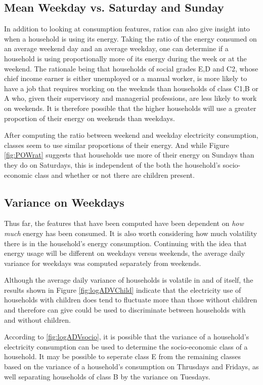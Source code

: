 \subsection*{Mean Weekday vs. Saturday and Sunday}
In addition to looking at consumption features, ratios can also give insight into when a household is using its energy. Taking the ratio of the energy consumed on an average weekend day and an average weekday, one can determine if a household is using proportionally more of its energy during the week or at the weekend. The rationale being that households of social grades E,D and C2, whose chief income earner is either unemployed or a manual worker, is more likely to have a job that requires working on the weeknds than households of class C1,B or A who, given their supervisory and managerial professions, are less likely to work on weekends. It is therefore possible that the higher households will use a greater proportion of their energy on weekends than weekdays. 
\POWrat

After computing the ratio between weekend and weekday electricity consumption, classes seem to use similar proportions of their energy. And while Figure \ref{fig:POWrat} suggests that households use more of their energy on Sundays than they do on Saturdays, this is independent of the both the household's socio-economic class and whether or not there are children present.


\subsection*{Variance on Weekdays}
Thus far, the features that have been computed have been dependent on \textit{how much} energy has been consumed. It is also worth considering how much volatility there is in the household's energy consumption. Continuing with the idea that energy usage will be different on weekdays versus weekends, the average daily variance for weekdays was computed separately from weekends. 

\logADVChild %


Although the average daily variance of households is volatile in and of itself, the results shown in Figure \ref{fig:logADVChild} indicate that the electricity use of households with children does tend to fluctuate more than those without children and therefore can give could be used to discriminate between households with and without children. 

\logADVSocio %

According to \ref{fig:logADVsocio}, it is possible that the variance of a household's electricity consumption can be used to determine the socio-economic class of a household. It may be possible to seperate class E from the remaining classes based on the variance of a household's consumption on Thrusdays and Fridays, as well separating households of class B by the variance on Tuesdays. 

